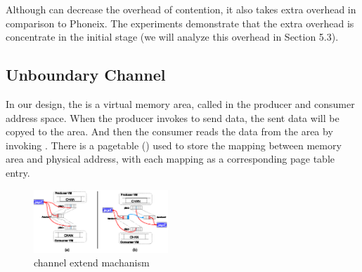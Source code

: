 Although \myth can decrease the overhead of contention,
it also takes extra overhead in comparison to Phoneix. The experiments demonstrate that the extra overhead 
is concentrate in the initial stage (we will analyze this overhead in Section 5.3). 


\subsection{Unboundary Channel}
In our design, the \chan is a virtual memory area, called  in the producer and consumer address space.
When the producer invokes  to send data, the sent data will be copyed to the  area.
And then the consumer reads the data from the  area  by invoking .
There is a pagetable () used to store the mapping between  memory area and physical address, with each mapping as a corresponding page table entry.



\begin{figure}[!h!t]  
	\centering
	\includegraphics[width=0.45\textwidth]{eps/chan_extend.eps}
	\caption{channel extend machanism}
	\label{fig:spmckern:extend}
\end{figure}

